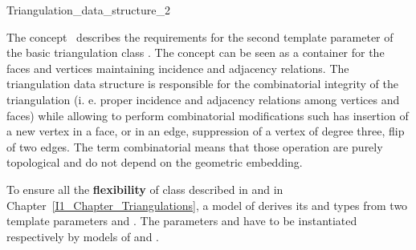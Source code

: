 
\begin{ccRefConcept}{Triangulation_data_structure_2}

\ccDefinition
  
The concept \ccRefName\ describes the requirements  for
the second template parameter of the basic triangulation class
.
The concept can be seen as a container for the 
faces and vertices maintaining incidence and adjacency relations.
The triangulation data structure
 is responsible for  the combinatorial integrity of the triangulation
(i. e. proper incidence and adjacency relations among vertices
and faces) while 
allowing  to perform combinatorial modifications
such has 
insertion of a new vertex in a face, or in an edge,
suppression of a vertex of degree three,  flip of two edges.
The term combinatorial means that those operation are purely topological
and do not depend on the geometric embedding.


\ccTypes
{} {}
\ccGlue
{}
\ccGlue
{}
\ccGlue
{}

To ensure all the \textbf{flexibility} of class 
described in 
and in Chapter~\ref{I1_Chapter_Triangulations}, a model of 
\ccRefName derives its  and  types
from two template parameters  and .
The parameters  and 
have to be instantiated respectively
by models of  and 
.





\end{ccRefConcept}
